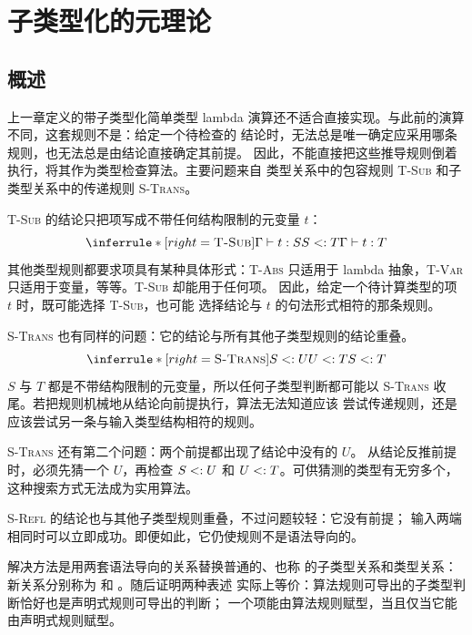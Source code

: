 
\chapter{子类型化的元理论}
\label{chap:16}

\section*{概述}
\label{sec:16-overview}

上一章定义的带子类型化简单类型 lambda 演算还不适合直接实现。与此前的演算
不同，这套规则不是：给定一个待检查的
结论时，无法总是唯一确定应采用哪条规则，也无法总是由结论直接确定其前提。
因此，不能直接把这些推导规则倒着执行，将其作为类型检查算法。主要问题来自
类型关系中的包容规则 \textsc{T-Sub} 和子类型关系中的传递规则 \textsc{S-Trans}。

\textsc{T-Sub} 的结论只把项写成不带任何结构限制的元变量 \(t\)：
\[
\inferrule*[right=\textsc{T-Sub}]
 {\Gamma\vdash t:S\\S\subtype T}
 {\Gamma\vdash t:T}
\]
其他类型规则都要求项具有某种具体形式：\textsc{T-Abs} 只适用于 lambda
抽象，\textsc{T-Var} 只适用于变量，等等。\textsc{T-Sub} 却能用于任何项。
因此，给定一个待计算类型的项 \(t\) 时，既可能选择 \textsc{T-Sub}，也可能
选择结论与 \(t\) 的句法形式相符的那条规则。

\textsc{S-Trans} 也有同样的问题：它的结论与所有其他子类型规则的结论重叠。
\[
\inferrule*[right=\textsc{S-Trans}]
 {S\subtype U\\U\subtype T}
 {S\subtype T}
\]
\(S\) 与 \(T\) 都是不带结构限制的元变量，所以任何子类型判断都可能以
\textsc{S-Trans} 收尾。若把规则机械地从结论向前提执行，算法无法知道应该
尝试传递规则，还是应该尝试另一条与输入类型结构相符的规则。

\textsc{S-Trans} 还有第二个问题：两个前提都出现了结论中没有的 \(U\)。
从结论反推前提时，必须先猜一个 \(U\)，再检查 \(S\mathrel{<:} U\) 和
\(U\mathrel{<:} T\)。可供猜测的类型有无穷多个，这种搜索方式无法成为实用算法。

\textsc{S-Refl} 的结论也与其他子类型规则重叠，不过问题较轻：它没有前提；
输入两端相同时可以立即成功。即便如此，它仍使规则不是语法导向的。

解决方法是用两套语法导向的关系替换普通的、也称
的子类型关系和类型关系：新关系分别称为
和
。随后证明两种表述
实际上等价：算法规则可导出的子类型判断恰好也是声明式规则可导出的判断；
一个项能由算法规则赋型，当且仅当它能由声明式规则赋型。

